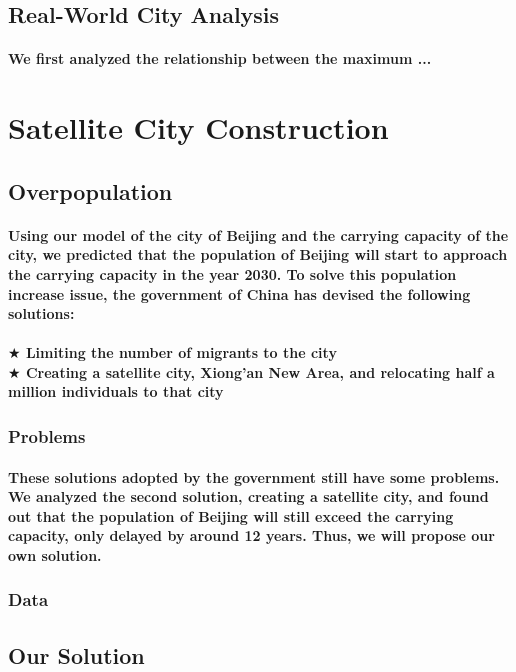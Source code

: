 \documentclass{article}
\begin{document}
\subsection{Real-World City Analysis}
\paragraph{We first analyzed the relationship between the maximum ...}

\section{Satellite City Construction}
\subsection{Overpopulation}
\paragraph{Using our model of the city of Beijing and the carrying capacity of the city, we predicted that the population of Beijing will start to approach the carrying capacity in the year 2030. To solve this population increase issue, the government of China has devised the following solutions:}
\paragraph{$\bigstar$ Limiting the number of migrants to the city \\
$\bigstar$ Creating a satellite city, Xiong'an New Area, and relocating half a million individuals to that city}

\subsubsection{Problems}
\paragraph{These solutions adopted by the government still have some problems. We analyzed the second solution, creating a satellite city, and found out that the population of Beijing will still exceed the carrying capacity, only delayed by around 12 years. Thus, we will propose our own solution.}
\subsubsection{Data}
\subsection{Our Solution}
\end{document}

